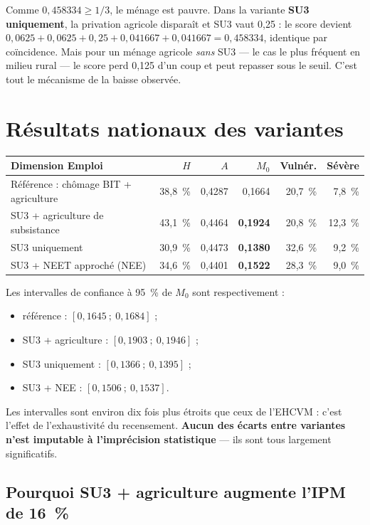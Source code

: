 \documentclass[11pt,a4paper]{article}
\begin{document}
Comme $0{,}458334 \geq 1/3$, le ménage est pauvre. Dans la variante \textbf{SU3 uniquement}, la
privation agricole disparaît et SU3 vaut 0,25 : le score devient
$0{,}0625+0{,}0625+0{,}25+0{,}041667+0{,}041667 = 0{,}458334$, identique par coïncidence. Mais
pour un ménage agricole \emph{sans} SU3 --- le cas le plus fréquent en milieu rural --- le score
perd 0,125 d'un coup et peut repasser sous le seuil. C'est tout le mécanisme de la baisse
observée.

\section{Résultats nationaux des variantes}

\begin{center}
\small
\begin{tabular}{@{}p{4.8cm}rrrrr@{}}
\toprule
\textbf{Dimension Emploi} & $H$ & $A$ & $M_0$ & \textbf{Vulnér.} & \textbf{Sévère} \\
\midrule
Référence : chômage BIT + agriculture & 38,8~\% & 0,4287 & 0,1664 & 20,7~\% & 7,8~\% \\
SU3 + agriculture de subsistance & 43,1~\% & 0,4464 & \textbf{0,1924} & 20,8~\% & 12,3~\% \\
SU3 uniquement & 30,9~\% & 0,4473 & \textbf{0,1380} & 32,6~\% & 9,2~\% \\
SU3 + NEET approché (NEE) & 34,6~\% & 0,4401 & \textbf{0,1522} & 28,3~\% & 9,0~\% \\
\bottomrule
\end{tabular}
\end{center}

Les intervalles de confiance à 95~\% de $M_0$ sont respectivement :

\begin{itemize}
  \item référence : $[0{,}1645\ ;\ 0{,}1684]$ ;
  \item SU3 + agriculture : $[0{,}1903\ ;\ 0{,}1946]$ ;
  \item SU3 uniquement : $[0{,}1366\ ;\ 0{,}1395]$ ;
  \item SU3 + NEE : $[0{,}1506\ ;\ 0{,}1537]$.
\end{itemize}

Les intervalles sont environ dix fois plus étroits que ceux de l'EHCVM : c'est l'effet de
l'exhaustivité du recensement. \textbf{Aucun des écarts entre variantes n'est imputable à
l'imprécision statistique} --- ils sont tous largement significatifs.

\subsection{Pourquoi SU3 + agriculture augmente l'IPM de 16~\%}
\end{document}

